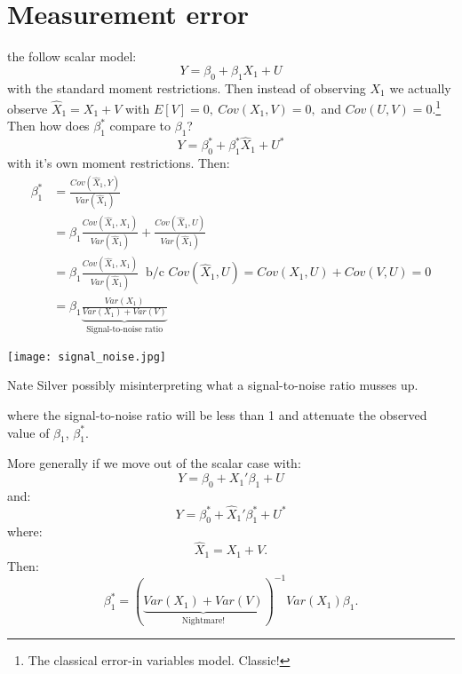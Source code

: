 \documentclass{tufte-book}
\theoremstyle{mytheoremstyle}
\theoremstyle{mylemstyle}
\theoremstyle{mydefstyle}
\begin{document}
\section{Measurement error}
 the follow scalar model:
	\[Y = \beta_0 + \beta_1X_1 + U\]
with the standard moment restrictions. Then instead of observing \(X_1\) we actually observe \(\hat{X}_1 = X_1 + V\) with \(E[V] = 0,\ Cov(X_1, V) = 0,\) and \(Cov(U, V) = 0\).\footnote{The classical error-in variables model. Classic!} Then how does \(\beta_1^*\) compare to \(\beta_1\)?
	\[Y = \beta_0^* + \beta_1^* \hat{X}_1 + U^*\]
with it's own moment restrictions. Then:
	\begin{align*}
		\beta_1^* & = \frac{Cov(\hat{X}_1, Y)}{Var(\hat{X}_1)} \\
				& = \beta_1 \frac{Cov(\hat{X}_1, X_1)}{Var(\hat{X}_1)} + \frac{Cov(\hat{X}_1, U)}{Var(\hat{X}_1)}\\
				& = \beta_1 \frac{Cov(\hat{X}_1, X_1)}{Var(\hat{X}_1)}\ \text{ b/c } Cov(\hat{X}_1, U) = Cov(X_1, U) + Cov(V, U) = 0\\
				& = \beta_1 \underbrace{\frac{Var(X_1)}{Var(X_1) + Var(V)}}_\textrm{Signal-to-noise ratio}
	\end{align*}	\begin{marginfigure} \texttt{[image: signal\_noise.jpg]} \caption{Nate Silver possibly misinterpreting what a signal-to-noise ratio musses up.} \end{marginfigure}
\noindent where the signal-to-noise ratio will be less than 1 and attenuate the observed value of \(\beta_1\), \(\beta_1^*\).

More generally if we move out of the scalar case with:
	\[Y = \beta_0 + X_1'\beta_1 + U\]
and:
	\[Y = \beta_0^* + \hat{X}_1'\beta_1^* + U^*\]
where:
	\[\hat{X}_1 = X_1 + V \text{.}\]
Then:
	\[\beta_1^* = (\underbrace{Var(X_1) + Var(V)}_\textrm{Nightmare!})^{-1}Var(X_1)\beta_1 \text{.}\]
\end{document}
